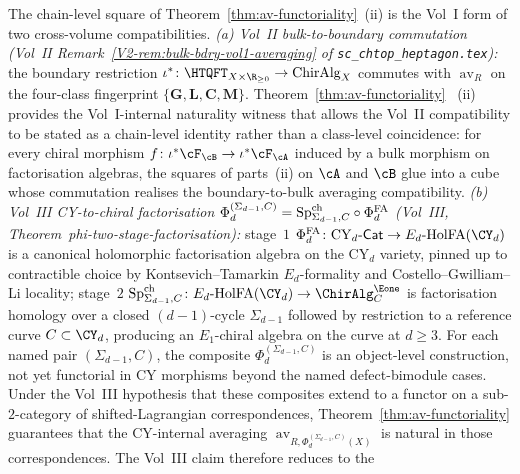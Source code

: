 \begin{remark}
\label{rem:av-functoriality-xvol}
The chain-level square of
Theorem~\textup{\ref{thm:av-functoriality}}~\textup{(ii)} is the
Vol~I form of two cross-volume compatibilities.
\emph{(a) Vol~II bulk-to-boundary commutation
\textup{(}Vol~II Remark~\textup{\ref*{V2-rem:bulk-bdry-vol1-averaging}}
of \texttt{sc\_chtop\_heptagon.tex}\textup{)}\textup{:}}
the boundary restriction $\iota^*\colon \HTQFT_{X\times\R_{\geq 0}}
\to \mathrm{ChirAlg}_X$ commutes with $\operatorname{av}_R$ on
the four-class fingerprint $\{\mathbf{G},\mathbf{L},\mathbf{C},
\mathbf{M}\}$. Theorem~\textup{\ref{thm:av-functoriality}}~%
\textup{(ii)} provides the Vol~I-internal naturality witness
that allows the Vol~II compatibility to be stated as a chain-level
identity rather than a class-level coincidence: for every chiral
morphism $f\colon \iota^*\cF_\cB \to \iota^*\cF_\cA$ induced by a
bulk morphism on factorisation algebras, the squares of
parts~\textup{(ii)} on $\cA$ and $\cB$ glue into a cube whose
commutation realises the boundary-to-bulk averaging
compatibility.
\emph{(b) Vol~III CY-to-chiral factorisation
$\Phi_d^{(\Sigma_{d-1}, C)} = \mathrm{Sp}^{\mathrm{ch}}_{\Sigma_{d-1}, C} \circ \Phi^{\mathrm{FA}}_d$
\textup{(}Vol~III, Theorem~\textup{phi-two-stage-factorisation}\textup{)}\textup{:}}
stage~$1$ $\PhiFA_d\colon \mathrm{CY}_d\text{-}\mathsf{Cat} \to
E_d\text{-}\HolFA(\CY_d)$ is a canonical holomorphic factorisation
algebra on the CY$_d$ variety, pinned up to contractible choice by
Kontsevich--Tamarkin $E_d$-formality and Costello--Gwilliam--Li
locality; stage~$2$ $\SpCh_{\Sigma_{d-1}, C}\colon
E_d\text{-}\HolFA(\CY_d) \to \ChirAlg^{\Eone}_C$ is factorisation
homology over a closed $(d-1)$-cycle $\Sigma_{d-1}$ followed by
restriction to a reference curve $C \subset \CY_d$, producing an
$E_1$-chiral algebra on the curve at $d \geq 3$. For each named pair
$(\Sigma_{d-1},C)$, the composite
$\Phi_d^{(\Sigma_{d-1},C)}$ is an object-level construction, not yet
functorial in CY morphisms beyond the named defect-bimodule cases.
Under the Vol~III hypothesis that these composites extend to a
functor on a sub-$2$-category of shifted-Lagrangian correspondences,
Theorem~\textup{\ref{thm:av-functoriality}} guarantees that the
CY-internal averaging
$\operatorname{av}_{R,\Phi_d^{(\Sigma_{d-1},C)}(X)}$ is natural in
those correspondences. The Vol~III claim therefore reduces to the

\end{remark}
